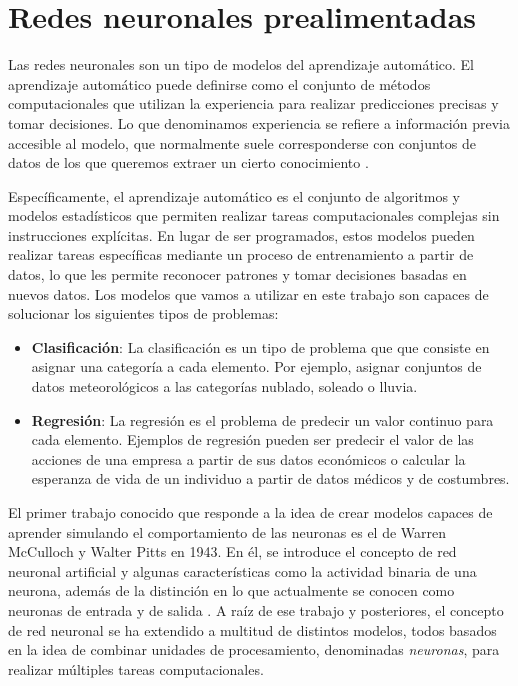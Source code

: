 
\chapter{Redes neuronales prealimentadas}\label{chap:ann}

Las redes neuronales son un tipo de modelos del aprendizaje automático. El aprendizaje automático puede definirse como
el conjunto de métodos computacionales que utilizan la experiencia para realizar predicciones precisas y tomar 
decisiones. Lo que denominamos experiencia se refiere a información previa accesible al modelo, que normalmente suele 
corresponderse con conjuntos de datos de los que queremos extraer un cierto conocimiento 
\cite{mohri_rostamizadeh_talwalkar_2018}. 

\vspace{10pt}
Específicamente, el aprendizaje automático es el conjunto de algoritmos y modelos estadísticos que permiten realizar 
tareas computacionales complejas sin instrucciones explícitas. En lugar de ser programados, estos modelos pueden 
realizar tareas específicas mediante un proceso de entrenamiento a partir de datos, lo que les permite reconocer 
patrones y tomar decisiones basadas en nuevos datos. Los modelos que vamos a utilizar en este trabajo son capaces de 
solucionar los siguientes tipos de problemas:

\begin{itemize}
    \item \textbf{Clasificación}: La clasificación es un tipo de problema que que consiste en asignar una categoría a cada elemento. Por ejemplo, asignar conjuntos de datos meteorológicos a las categorías nublado, soleado o lluvia.
    \item \textbf{Regresión}: La regresión es el problema de predecir un valor continuo para cada elemento. Ejemplos
    de regresión pueden ser predecir el valor de las acciones de una empresa a partir de sus datos económicos o 
    calcular la esperanza de vida de un individuo a partir de datos médicos y de costumbres.
\end{itemize}

El primer trabajo conocido que responde a la idea de crear modelos capaces de aprender simulando el comportamiento de
las neuronas es el de Warren McCulloch y Walter Pitts en 1943. En él, se introduce el concepto de red neuronal 
artificial y algunas características como la actividad binaria de una neurona, además de la distinción en lo que
actualmente se conocen como neuronas de entrada y de salida \cite{mcculloh-pitts}. A raíz de ese trabajo y posteriores,
el concepto de red neuronal se ha extendido a multitud de distintos modelos, todos basados en la idea de combinar
unidades de procesamiento, denominadas \textit{neuronas}, para realizar múltiples tareas computacionales. 

